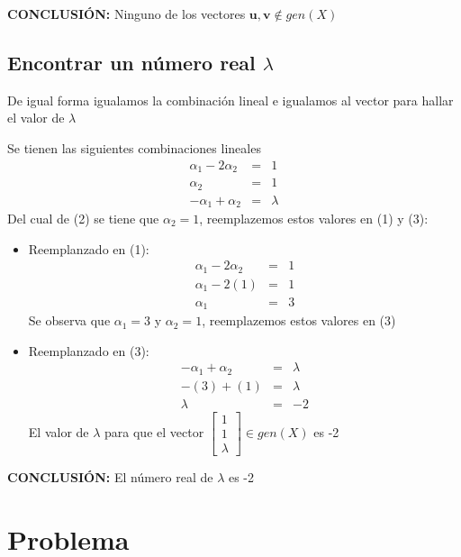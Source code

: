 \textbf{CONCLUSIÓN:} Ninguno de los vectores $\mathbf{u},\mathbf{v} \notin gen(X)$

\subsection{Encontrar un número real $\lambda$}
De igual forma igualamos la combinación lineal e igualamos al vector para hallar el valor de $\lambda$

\setcounter{equation}{0}
Se tienen las siguientes combinaciones lineales
\begin{eqnarray}
    {\alpha}_{1} - 2 {\alpha}_{2} &=& 1 \\
    {\alpha}_{2} &=& 1 \\
    -{\alpha}_{1} + {\alpha}_{2} &=& \lambda
\end{eqnarray}
Del cual de (2) se tiene que $\alpha_2 = 1$, reemplazemos estos valores en (1) y (3):
\begin{itemize}
     \item Reemplanzado en (1):
     \begin{eqnarray}
         {\alpha}_{1} - 2 {\alpha}_{2} &=& 1 \nonumber \\
         {\alpha}_{1} - 2 (1) &=& 1 \nonumber \\
         {\alpha}_{1} &=& 3 \nonumber
     \end{eqnarray}
     Se observa que ${\alpha}_{1} = 3$ y ${\alpha}_{2} = 1$, reemplazemos estos valores en (3) 
     \item Reemplanzado en (3):
     \begin{eqnarray}
         -{\alpha}_{1} + {\alpha}_{2} &=& \lambda \nonumber \\
         -(3) + (1) &=& \lambda \nonumber \\
         \lambda &=& -2 \nonumber
     \end{eqnarray}
     El valor de $\lambda$ para que el vector $\begin{bmatrix}
1 \\ 
1 \\ 
\lambda
\end{bmatrix} \in gen(X)$ es -2 
 \end{itemize} 

\textbf{CONCLUSIÓN:} El número real de $\lambda$ es -2

\section{Problema}

